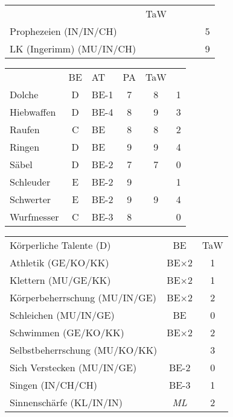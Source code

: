 \documentclass{article}
\begin{document}
  \begin{table}[ht]
    \centering
    \begin{tabularx}{0.8\linewidth}{|Xclcc|c|}
      \hline
      \rowcolor{gray}\multicolumn{5}{|l|}{Gabe (F)}&TaW\\
      \rowcolor{white} Prophezeien (IN/IN/CH) &&&&& 5\\
      \rowcolor{white} LK (Ingerimm) (MU/IN/CH) &&&&& 9\\
      \hline
    \end{tabularx}
    \centering
    \begin{tabularx}{0.8\linewidth}{|Xclcc|c|}
      \hline
      \rowcolor{gray} \multicolumn{2}{|l}{Kampftechniken}& BE & AT & PA &TaW\\ 
      \rowcolor{white}Dolche& D& BE-1& 7& 8& 1 \\
      \rowcolor{white}Hiebwaffen& D& BE-4& 8& 9& 3 \\
      \rowcolor{white}Raufen&C&BE&8&8&2\\ 
      \rowcolor{white}Ringen&D&BE&9&9&4\\ 
      \rowcolor{white}Säbel&D&BE-2&7&7&0\\ 
      \rowcolor{white}Schleuder&E&BE-2&9&&1\\ 
      \rowcolor{white}Schwerter&E&BE-2&9&9&4\\ 
      \rowcolor{white}Wurfmesser&C&BE-3&8&&0\\
      \hline
    \end{tabularx}
    \centering
    \begin{tabularx}{0.8\linewidth}{|Xc|c|}
      \hline
      \rowcolor{gray}  Körperliche Talente (D)& BE &TaW\\
      \rowcolor{white} Athletik (GE/KO/KK)& BE$\times$2 & 1\\
      \rowcolor{white} Klettern (MU/GE/KK)& BE$\times$2 & 1\\
      \rowcolor{white} Körperbeherrschung (MU/IN/GE) & BE$\times$2& 2\\
      \rowcolor{white} Schleichen (MU/IN/GE) & BE& 0\\
      \rowcolor{white} Schwimmen (GE/KO/KK) & BE$\times$2& 2\\
      \rowcolor{white} Selbstbeherrschung (MU/KO/KK)& & 3\\
      \rowcolor{white} Sich Verstecken (MU/IN/GE)&  BE-2&0\\
      \rowcolor{white} Singen (IN/CH/CH)& BE-3& 1\\
      \rowcolor{white} Sinnenschärfe (KL/IN/IN)& \emph{ML}&2\\

\end{tabularx}
\end{table}
\end{document}
